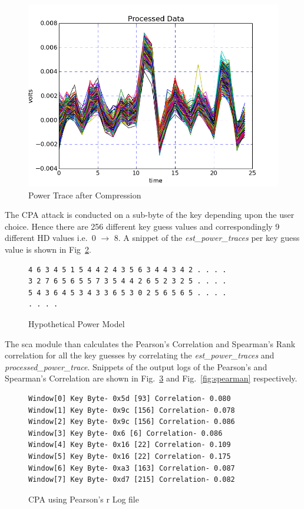 \documentclass{llncs}
\numberwithin{algorithm}{chapter}
\begin{document}
\begin{figure}[H]
\begin{center}
\includegraphics[scale=0.8]{figures/scaTrace4}
\caption{\label{fig:ptcp}Power Trace after Compression}
\end{center} 
\vspace{-3ex}
\end{figure}

The CPA attack is conducted on a sub-byte of the key depending upon the user choice. Hence 
there are 256 different key guess values and correspondingly 9 different HD values i.e.\ 0 $\rightarrow$ 8.
A snippet of the \emph{est\_power\_traces} per key guess value is shown in Fig~\ref{fig:fobos-estpower}. 
\begin{figure}[ht]
\begin{Verbatim}[frame=single]
4 6 3 4 5 1 5 4 4 2 4 3 5 6 3 4 4 3 4 2 . . . .
3 2 7 6 5 6 5 5 7 3 5 4 4 2 6 5 2 3 2 5 . . . .
5 4 3 6 4 5 3 4 3 3 6 5 3 0 2 5 6 5 6 5 . . . .
. . . .
\end{Verbatim}
\caption{\label{fig:fobos-estpower}Hypothetical Power Model}
\end{figure}

The sca module than calculates the Pearson's Correlation and Spearman's Rank correlation
for all the key guesses by correlating 
the \emph{est\_power\_traces} and \emph{processed\_power\_trace}. 
Snippets of the output logs of the Pearson's and Spearman's Correlation are shown
in Fig.~\ref{fig:pearson} and Fig.~\ref{fig:spearman} respectively.

\begin{figure}[H]
\begin{Verbatim}[frame=single]
Window[0] Key Byte- 0x5d [93] Correlation- 0.080
Window[1] Key Byte- 0x9c [156] Correlation- 0.078
Window[2] Key Byte- 0x9c [156] Correlation- 0.086
Window[3] Key Byte- 0x6 [6] Correlation- 0.086
Window[4] Key Byte- 0x16 [22] Correlation- 0.109
Window[5] Key Byte- 0x16 [22] Correlation- 0.175
Window[6] Key Byte- 0xa3 [163] Correlation- 0.087
Window[7] Key Byte- 0xd7 [215] Correlation- 0.082
\end{Verbatim}
\caption{\label{fig:pearson}CPA using Pearson's r Log file}
\end{figure}
\end{document}
